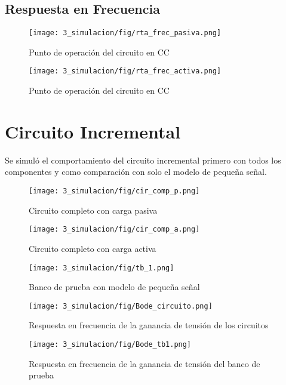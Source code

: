 \subsection{Respuesta en Frecuencia}
\begin{figure}[H]
    \centering
    \texttt{[image: 3\_simulacion/fig/rta\_frec\_pasiva.png]}
    \label{mediciones_pol_activa}
    \caption{Punto de operación del circuito en CC}
\end{figure}

\begin{figure}[H]
    \centering
    \texttt{[image: 3\_simulacion/fig/rta\_frec\_activa.png]}
    \label{mediciones_pol_activa}
    \caption{Punto de operación del circuito en CC}
\end{figure}


\newpage
\section{Circuito Incremental}
Se simuló el comportamiento del circuito incremental primero con todos los componentes y como comparación con solo el modelo de pequeña señal.

\begin{figure}[ht]
    \begin{minipage}[t]{0.45\textwidth}
        \centering
        \texttt{[image: 3\_simulacion/fig/cir\_comp\_p.png]}
        \caption{Circuito completo con carga pasiva}
    \end{minipage}\hfill
    \begin{minipage}[t]{0.45\textwidth}
        \centering
        \texttt{[image: 3\_simulacion/fig/cir\_comp\_a.png]}
        \caption{Circuito completo con carga activa}
    \end{minipage}
\end{figure}

\begin{figure}[ht]
    \centering
    \texttt{[image: 3\_simulacion/fig/tb\_1.png]}
    \caption{Banco de prueba con modelo de pequeña señal}
\end{figure}

\begin{figure}[ht]
    \begin{minipage}[t]{0.48\textwidth}
        \centering
        \texttt{[image: 3\_simulacion/fig/Bode\_circuito.png]}
        \caption{Respuesta en frecuencia de la ganancia de tensión de los circuitos}
        \label{fig:bode_cir}
    \end{minipage}\hfill
    \begin{minipage}[t]{0.48\textwidth}
        \centering
        \texttt{[image: 3\_simulacion/fig/Bode\_tb1.png]}
        \caption{Respuesta en frecuencia de la ganancia de tensión del banco de prueba}
        \label{fig:bode_tb1}
    \end{minipage}
\end{figure}

